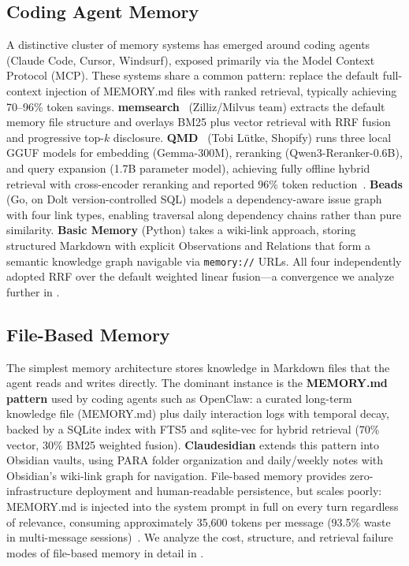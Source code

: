 \subsection{Coding Agent Memory}
\label{sec:coding-agents}

A distinctive cluster of memory systems has emerged around coding
agents (Claude Code, Cursor, Windsurf), exposed primarily via the
Model Context Protocol (MCP). These systems share a common pattern:
replace the default full-context injection of MEMORY.md files with
ranked retrieval, typically achieving 70--96\% token savings.
\textbf{memsearch}~\cite{zilliz2026a} (Zilliz/Milvus team) extracts
the default memory file structure and overlays BM25 plus vector
retrieval with RRF fusion and progressive top-$k$ disclosure.
\textbf{QMD}~\cite{lutke2026qmd} (Tobi L\"utke, Shopify) runs three
local GGUF models for embedding (Gemma-300M), reranking
(Qwen3-Reranker-0.6B), and query expansion (1.7B parameter model),
achieving fully offline hybrid retrieval with cross-encoder reranking
and reported 96\% token reduction~\cite{levine2026}. \textbf{Beads}
(Go, on Dolt version-controlled SQL) models a dependency-aware issue
graph with four link types, enabling traversal along dependency chains
rather than pure similarity. \textbf{Basic Memory} (Python) takes a
wiki-link approach, storing structured Markdown with explicit
Observations and Relations that form a semantic knowledge graph
navigable via \texttt{memory://} URLs. All four independently adopted
RRF over the default weighted linear fusion---a convergence we
analyze further in .

\subsection{File-Based Memory}
\label{sec:filebased}

The simplest memory architecture stores knowledge in Markdown files
that the agent reads and writes directly. The dominant instance is the
\textbf{MEMORY.md pattern} used by coding agents such as OpenClaw:
a curated long-term knowledge file (MEMORY.md) plus daily interaction
logs with temporal decay, backed by a SQLite index with FTS5 and
sqlite-vec for hybrid retrieval (70\% vector, 30\% BM25 weighted
fusion). \textbf{Claudesidian} extends this pattern into Obsidian
vaults, using PARA folder organization and daily/weekly notes with
Obsidian's wiki-link graph for navigation. File-based memory provides
zero-infrastructure deployment and human-readable persistence, but
scales poorly: MEMORY.md is injected into the system prompt in full
on every turn regardless of relevance, consuming approximately 35,600
tokens per message (93.5\% waste in multi-message
sessions)~\cite{openclaw9157}. We analyze the cost, structure, and
retrieval failure modes of file-based memory in detail in
.

